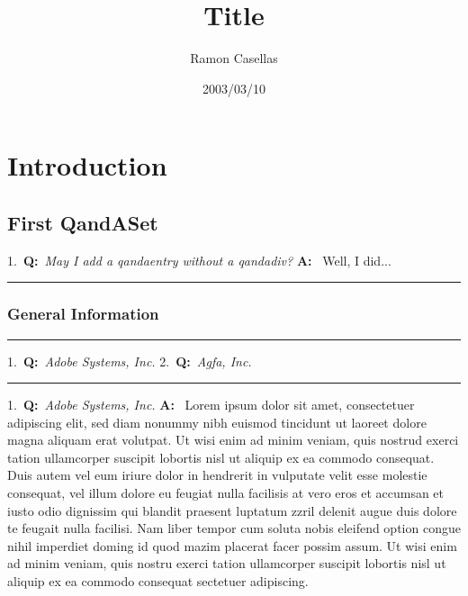 \documentclass[pdftex,english,a4paper,10pt]{article}
\title{\textbf{Title}}
\date{2003/03/10}
\author{Ramon Casellas}
\begin{document}
{\maketitle\pagestyle{empty}\thispagestyle{empty}}

\section{Introduction}
\label{id2735069}\hypertarget{id2735069}{}%
\subsection*{First QandASet}
\label{id2735076}
\vspace{1em}
\noindent{}1.~\textbf{Q:}~\textit{May I add a qandaentry without a qandadiv?}
\newline
\noindent\textbf{A:}~
Well, I did...


\vspace{1em}
\noindent\begin{minipage}{\linewidth}
\vspace{0.25em}\hrule\vspace{0.25em}
\subsubsection*{General Information}\label{id2735102}
\hrule\vspace{0.25em}
\end{minipage}
\noindent{}1.~\textbf{Q:}~\textit{Adobe Systems, Inc.}
\newline
\noindent{}2.~\textbf{Q:}~\textit{Agfa, Inc.}
\vspace{0.25em}\hrule
\vspace{1em}
\noindent{}1.~\textbf{Q:}~\textit{Adobe Systems, Inc.}
\newline
\noindent\textbf{A:}~
Lorem ipsum dolor sit amet, consectetuer adipiscing elit, sed diam nonummy nibh euismod tincidunt ut laoreet dolore magna aliquam erat volutpat. Ut wisi enim ad minim veniam, quis nostrud exerci tation ullamcorper suscipit lobortis nisl ut aliquip ex ea commodo consequat. Duis autem vel eum iriure dolor in hendrerit in vulputate velit esse molestie consequat, vel illum dolore eu feugiat nulla facilisis at vero eros et accumsan et iusto odio dignissim qui blandit praesent luptatum zzril delenit augue duis dolore te feugait nulla facilisi. Nam liber tempor cum soluta nobis eleifend option congue nihil imperdiet doming id quod mazim placerat facer possim assum. Ut wisi enim ad minim veniam, quis nostru exerci tation ullamcorper suscipit lobortis nisl ut aliquip ex ea commodo consequat sectetuer adipiscing.
\end{document}
